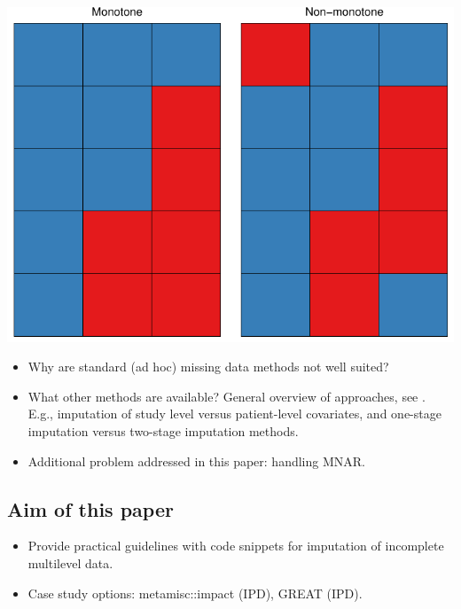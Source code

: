 \documentclass[
]{jss}
\begin{document}
\begin{CodeChunk}


\begin{center}\includegraphics{Multilevel-Missing-Data_files/figure-latex/patterns-1} \end{center}

\end{CodeChunk}

\begin{itemize}
\item
  Why are standard (ad hoc) missing data methods not well suited?
\item
  What other methods are available? General overview of approaches, see
  \citet{audi18} \citet{grun18}. E.g., imputation of study level versus
  patient-level covariates, and one-stage imputation versus two-stage
  imputation methods.
\item
  Additional problem addressed in this paper: handling MNAR.
\end{itemize}

\hypertarget{aim-of-this-paper}{%
\subsection{Aim of this paper}\label{aim-of-this-paper}}

\begin{itemize}
\item
  Provide practical guidelines with code snippets for imputation of
  incomplete multilevel data.
\item
  Case study options: metamisc::impact (IPD), GREAT (IPD).
\end{itemize}
\end{document}
